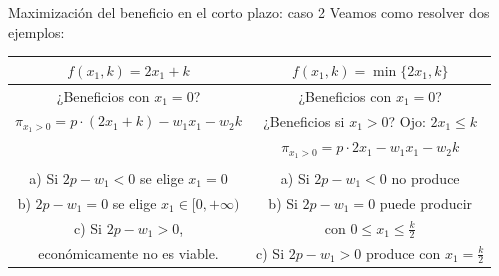 \documentclass{beamer}
\theoremstyle{definition}
\begin{document}
\begin{frame}{Maximización del beneficio en el corto plazo: caso 2}
\small
Veamos como resolver dos ejemplos:
\begin{center}
\begin{tabular}{c|c}
\hline
   $f(x_1,k)=2x_1+k$  &  $f(x_1,k)=\min \{2x_1,k\}$  \\
   \hline
   \color{gray} ¿Beneficios con $x_1=0$?     & \color{gray} ¿Beneficios con $x_1=0$?  \\
 \color{gray} $\pi_{x_1>0}=p\cdot( 2x_1+k)-w_1x_1-w_2k$& \color{gray}¿Beneficios si $x_1>0$? Ojo: $2 x_1\leq k$\\ 
       & \color{gray}  $\pi_{x_1>0}=p\cdot 2x_1-w_1x_1-w_2k$\\
   & \\
   \color{gray}a) Si $2p-w_1<0$ se elige $x_1=0$  & \color{gray} a) Si $2p-w_1<0$ no produce \\
 \color{gray} b) $2p-w_1=0$  se elige $x_1\in[0,+\infty)$ &\color{gray} b) Si $2p-w_1=0$ puede producir  \\
\color{gray} c) Si $2p-w_1>0$,   &  \color{gray} con $0\leq x_1 \leq \frac{k}{2}$\\
    \color{gray} económicamente no es viable.      & \color{gray} c) Si $2p-w_1>0$ produce con $ x_1 =\frac{k}{2}$
\end{tabular}
   \end{center}  
\end{frame}
\end{document}
